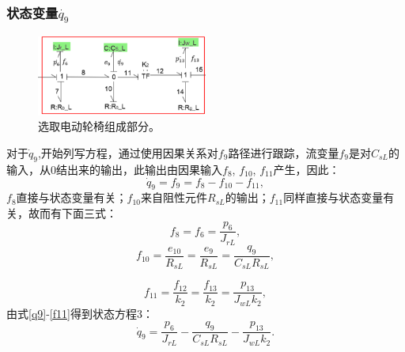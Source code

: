 \subsubsection{状态变量$\dot{ q_9 }$}
\begin{figure}[h]
	\centering
	\includegraphics[width=0.5\textwidth]{fig/equation3.png}
	\caption{选取电动轮椅组成部分。}\label{fig:equation3}
\end{figure}
对于$\dot{q} _ { 9 }$,开始列写方程，通过使用因果关系对$f_9$路径进行跟踪，流变量$f_9$是对$C_{sL}$的输入，从0结出来的输出，此输出由因果输入$f _ { 8 }$, $ f _ { 10 }$, $  f _ { 11 }$产生，因此：
\begin{equation}\label{q9}
\dot{ q }_{ 9 } = f _ { 9 } = f _ { 8 } - f _ { 10 } - f _ { 11 },
\end{equation}
$f_8$直接与状态变量有关；$f_{10}$来自阻性元件$R _ { sL }$的输出；$f_{11}$同样直接与状态变量有关，故而有下面三式：
\begin{equation}
f _ { 8 } = f _ { 6 } = \frac { p _ { 6 } } { J _ { r L } },
\end{equation}
\begin{equation}
f _ { 10 } = \frac { e _ { 10 } } { R _ { sL}  } = \frac { e _ { 9 } } { R _ { sL }  } = \frac { q _ { 9 } } { C _ { s L}  R _ { s  L } } ,
\end{equation}

\begin{equation}\label{f11}
f _ { 11 } = \frac { f _ { 12 } } { k _ { 2 } } = \frac { f _ { 13 } } { k _ { 2 } } = \frac { p _ { 13 } } { J _ { wL}  k _ { 2 } },
\end{equation}
由式\ref{q9}-\ref{f11}得到状态方程3：
\begin{equation}
\dot{ q } _ { 9 } = \frac { p _ { 6 } } { J _ { rL } } - \frac { q _ { 9 } } { C _ { sL }  R _ { s L}  } - \frac { p _ { 13 } } { J _ { w L }  k _ { 2 } }.
\end{equation}
